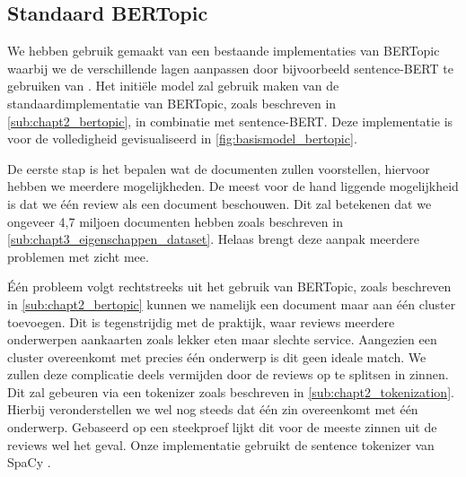 




\subsection{Standaard BERTopic}
We hebben gebruik gemaakt van een bestaande implementaties van BERTopic \cite{bertopic_homepage} waarbij we de verschillende lagen aanpassen door bijvoorbeeld sentence-BERT te gebruiken van \cite{sentence_transformers_implementation}. Het initiële model zal gebruik maken van de standaardimplementatie van BERTopic, zoals beschreven in \autoref{sub:chapt2_bertopic}, in combinatie met sentence-BERT. Deze implementatie is voor de volledigheid gevisualiseerd in \autoref{fig:basismodel_bertopic}.


De eerste stap is het bepalen wat de documenten zullen voorstellen, hiervoor hebben we meerdere mogelijkheden. De meest voor de hand liggende mogelijkheid is dat we één review als een document beschouwen. Dit zal betekenen dat we ongeveer 4,7 miljoen documenten hebben zoals beschreven in \autoref{sub:chapt3_eigenschappen_dataset}. Helaas brengt deze aanpak meerdere problemen met zicht mee. 

Één probleem volgt rechtstreeks uit het gebruik van BERTopic, zoals beschreven in \autoref{sub:chapt2_bertopic} kunnen we namelijk een document maar aan één cluster toevoegen. Dit is tegenstrijdig met de praktijk, waar reviews meerdere onderwerpen aankaarten zoals lekker eten maar slechte service. Aangezien een cluster overeenkomt met precies één onderwerp is dit geen ideale match. We zullen deze complicatie deels vermijden door de reviews op te splitsen in zinnen. Dit zal gebeuren via een tokenizer zoals beschreven in \autoref{sub:chapt2_tokenization}. Hierbij veronderstellen we wel nog steeds dat één zin overeenkomt met één onderwerp. Gebaseerd op een steekproef lijkt dit voor de meeste zinnen uit de reviews wel het geval. Onze implementatie gebruikt de sentence tokenizer van SpaCy \cite{spacy_main}.

